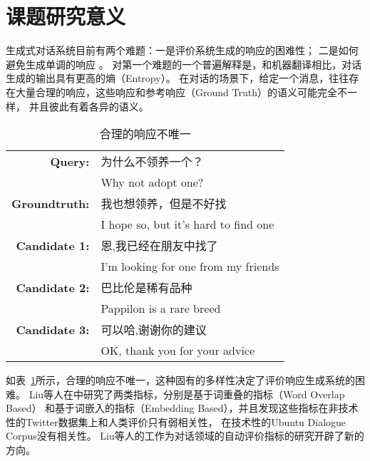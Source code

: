 \section{课题研究意义}\label{sec:research_meaning}
生成式对话系统目前有两个难题：一是评价系统生成的响应的困难性；
二是如何避免生成单调的响应
。
对第一个难题的一个普遍解释是，和机器翻译相比，对话生成的输出具有更高的熵（Entropy）。
在对话的场景下，给定一个消息，往往存在大量合理的响应，这些响应和参考响应（Ground Truth）的语义可能完全不一样，
并且彼此有着各异的语义。

\begin{table}[H]
    \centering
    \caption{合理的响应不唯一}
    \label{tab:multiple_valid_responses}
    \begin{tabular}{rl}
        \toprule
        \textbf{Query:} & 为什么不领养一个？ \\
        & Why not adopt one? \\
        \textbf{Groundtruth:} & 我也想领养，但是不好找 \\
        & I hope so, but it's hard to find one \\
        \midrule
        \textbf{Candidate 1:} & 恩,我已经在朋友中找了 \\
        & I'm looking for one from my friends \\
        \textbf{Candidate 2:} & 巴比伦是稀有品种 \\
        & Pappilon is a rare breed \\
        \textbf{Candidate 3:} & 可以哈,谢谢你的建议 \\
        & OK, thank you for your advice \\
        \bottomrule
    \end{tabular}
\end{table}

如表~\ref{tab:multiple_valid_responses}所示，合理的响应不唯一，这种固有的多样性决定了评价响应生成系统的困难。
Liu等人在\cite{DBLP:conf/emnlp/LiuLSNCP16}中研究了两类指标，分别是基于词重叠的指标（Word Overlap Based）
和基于词嵌入的指标（Embedding Based），并且发现这些指标在非技术性的Twitter数据集上和人类评价只有弱相关性，
在技术性的Ubuntu Dialogue Corpus没有相关性。
Liu等人的工作为对话领域的自动评价指标的研究开辟了新的方向。

